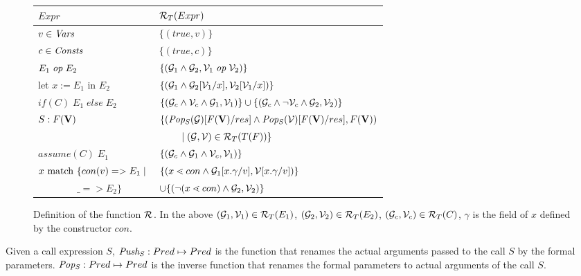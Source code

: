 \begin{figure}
\begin{center}
\begin{tabular}{|l|l|}
\hline
$Expr$ & $\mathcal{R}_{T}(Expr)$  \\ \hline
$v\in \mathit{Vars}$ 					& $\{ (true,v) \}$ \\
$c \in \mathit{Consts}$ 					& $\{ (true,c) \}$ \\
$E_1 \; \mathit{op} \; E_2$ & 
$\{ (\mathcal{G}_1 \wedge \mathcal{G}_2, \mathcal{V}_1 \; \mathit{op} \; \mathcal{V}_2) \}$  \\
%								
let $x := E_1$  in $E_2$  & 
 $\{ (\mathcal{G}_1 \wedge \mathcal{G}_2[\mathcal{V}_1/x],\mathcal{V}_2[\mathcal{V}_1/x]) \}$  \\
%		
$if(C) \; E_1 \; else \; E_2$ &
 $\{ (\mathcal{G}_c \wedge \mathcal{V}_c \wedge \mathcal{G}_1, \mathcal{V}_1) \} \cup 
 \{ (\mathcal{G}_c \wedge \neg \mathcal{V}_c \wedge \mathcal{G}_2, \mathcal{V}_2) \}$ \\
%
$S: F(\mathbf{V})$ & 
	$\{ (\mathit{Pop_{S}}(\mathcal{G})[F(\mathbf{V})/res] \wedge \mathit{Pop_{S}}(\mathcal{V})[F(\mathbf{V})/res], F(\mathbf{V}))$ \\
	& $\qquad \; | \; (\mathcal{G},\mathcal{V}) \in \mathcal{R}_{T}(T(F)) \}$  \\
%
$assume(C) \; E_1$  &  
   $\{ (\mathcal{G}_c \wedge \mathcal{G}_1 \wedge \mathcal{V}_c, \mathcal{V}_1) \}$ \\
%
$x \text{ match } \{ con(v)=> E_1 \; | \; $ & 
		$\{ (x \lessdot con \wedge \mathcal{G}_1[x.\gamma/v], \mathcal{V}[x.\gamma/v]) \}$ \\ 
$\qquad \qquad \_ => E_2 \}$		& 
 		$\cup \{ (\neg (x \lessdot con) \wedge \mathcal{G}_2, \mathcal{V}_2)\} $ \\
\hline
\end{tabular}
\end{center}
\caption{Definition of the function $\mathcal{R}_{}$. In the above
$(\mathcal{G}_1,\mathcal{V}_1) \in \mathcal{R}_{T}(E_1)$, $(\mathcal{G}_2,\mathcal{V}_2) \in \mathcal{R}_{T}(E_2)$, 
$(\mathcal{G}_c,\mathcal{V}_c) \in \mathcal{R}_{T}(C)$, 
$\gamma$ is the field of $x$ defined by the constructor $con$.} \label{fig:vc}
\end{figure}
%
Given a call expression $S$, $\mathit{Push_{S}}: Pred \mapsto Pred$ is the 
function that renames the actual arguments passed to the call $S$ by the formal parameters.
$\mathit{Pop_{S}}: Pred \mapsto Pred$ is the inverse function that renames the formal parameters
to actual arguments of the call $S$.

